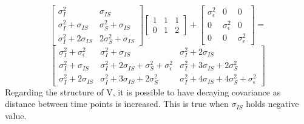\documentclass[12pt, utf8]{article}
\begin{document}
\[
\begin{bmatrix}
\sigma^2_{I}               & \sigma_{IS} \\
\sigma^2_{I} + \sigma_{IS} & \sigma^2_{S} + \sigma_{IS} \\
\sigma^2_{I} + 2\sigma_{IS} & 2\sigma^2_{S} + \sigma_{IS} 
\end{bmatrix}
\begin{bmatrix}
1 & 1 & 1 \\
0 & 1 & 2
\end{bmatrix}
+ 
\begin{bmatrix}
\sigma^2_{\epsilon} & 0 & 0 \\
0 & \sigma^2_{\epsilon} & 0 \\
0 & 0 & \sigma^2_{\epsilon} 
\end{bmatrix}
= 
\]
\[
\begin{bmatrix}
\sigma^2_{I} + \sigma^2_{\epsilon}  & \sigma^2_{I} + \sigma_{IS}  & \sigma^2_{I} + 2\sigma_{IS}\\
\sigma^2_{I} + \sigma_{IS} & \sigma^2_{I} + 2\sigma_{IS} + \sigma^2_{S} + \sigma^2_{\epsilon}  & \sigma^2_{I} + 3\sigma_{IS} + 2\sigma^2_{S}\\
\sigma^2_{I} + 2\sigma_{IS} & \sigma^2_{I} + 3\sigma_{IS} + 2\sigma^2_{S} & \sigma^2_{I} + 4\sigma_{IS} + 4\sigma^2_{S} + \sigma^2_{\epsilon}
\end{bmatrix}
\]
Regarding the structure of V, it is possible to have decaying covariance as distance between time points is increased. This is true when $\sigma_{IS}$ holds negative value. 
\end{document}
